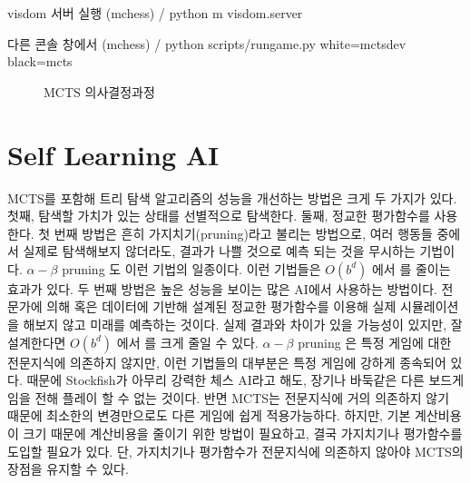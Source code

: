 \documentclass[letterpaper,10pt,english]{sphinxmanual}
\begin{document}
%
\begin{sphinxVerbatim}[commandchars=\\\{\}]
\PYGZsh{} visdom 서버 실행
(mchess) \PYGZti{}/ python \PYGZhy{}m visdom.server

\PYGZsh{} 다른 콘솔 창에서
(mchess) \PYGZti{}/ python scripts/run\PYGZus{}game.py \PYGZhy{}\PYGZhy{}white=mcts\PYGZus{}dev \PYGZhy{}\PYGZhy{}black=mcts
\end{sphinxVerbatim}

\begin{figure}[htbp]
\centering
\capstart

\noindent{}
\caption{MCTS 의사결정과정}\label{\detokenize{04-mcts:mcts-visualization}}\label{\detokenize{04-mcts:id10}}\end{figure}

\newpage


\section{Self Learning AI}
\label{\detokenize{05-self_learning:self-learning-ai}}\label{\detokenize{05-self_learning::doc}}
MCTS를 포함해 트리 탐색 알고리즘의 성능을 개선하는 방법은 크게 두 가지가 있다.
첫째, 탐색할 가치가 있는 상태를 선별적으로 탐색한다. 둘째, 정교한 평가함수를 사용한다.
첫 번째 방법은 흔히 가지치기(pruning)라고 불리는 방법으로, 여러 행동들 중에서 실제로 탐색해보지 않더라도,
결과가 나쁠 것으로 예측 되는 것을 무시하는 기법이다. \(\alpha-\beta\) pruning 도 이런 기법의 일종이다.
이런 기법들은 \(O(b^d)\) 에서  를 줄이는 효과가 있다.
두 번째 방법은 높은 성능을 보이는 많은 AI에서 사용하는 방법이다. 전문가에 의해 혹은 데이터에 기반해 설계된 정교한
평가함수를 이용해 실제 시뮬레이션을 해보지 않고 미래를 예측하는 것이다. 실제 결과와 차이가 있을 가능성이 있지만,
잘 설계한다면 \(O(b^d)\) 에서  를 크게 줄일 수 있다.
\(\alpha-\beta\) pruning 은 특정 게임에 대한 전문지식에 의존하지 않지만, 이런 기법들의 대부분은 특정 게임에 강하게 종속되어 있다.
때문에 Stockfish가 아무리 강력한 체스 AI라고 해도, 장기나 바둑같은 다른 보드게임을 전해 플레이 할 수 없는 것이다.
반면 MCTS는 전문지식에 거의 의존하지 않기 때문에 최소한의 변경만으로도 다른 게임에 쉽게 적용가능하다.
하지만, 기본 계산비용이 크기 때문에 계산비용을 줄이기 위한 방법이 필요하고, 결국 가지치기나 평가함수를 도입할 필요가 있다.
단, 가지치기나 평가함수가 전문지식에 의존하지 않아야 MCTS의 장점을 유지할 수 있다.
\end{document}
